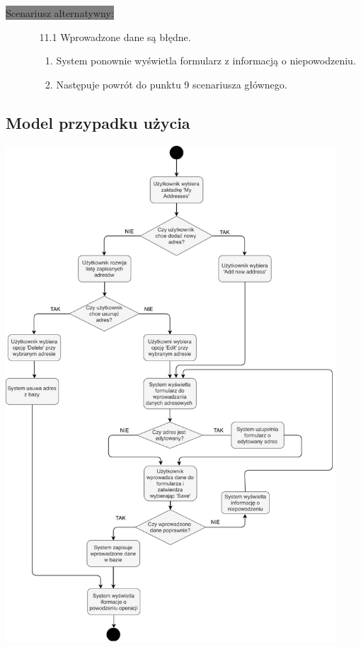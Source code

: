 \documentclass[12pt]{report}
\begin{document}
		\colorbox{grey}{Scenariusz alternatywny:}
		\begin{enumerate}\addtocounter{enumi}{6}
			\item[]
			\begin{enumerate}
				\item[11.1] Wprowadzone dane są błędne.
				\begin{enumerate}
					\item System ponownie wyświetla formularz z informacją o niepowodzeniu.
					\item Następuje powrót do punktu 9 scenariusza głównego.
				\end{enumerate}
			\end{enumerate}
		\end{enumerate}
	
	\subsection{Model przypadku użycia}
	\begin{center}
		\includegraphics[width=350pt]{ustawienia.pdf}
	\end{center}
	\newpage
	
\end{document}
